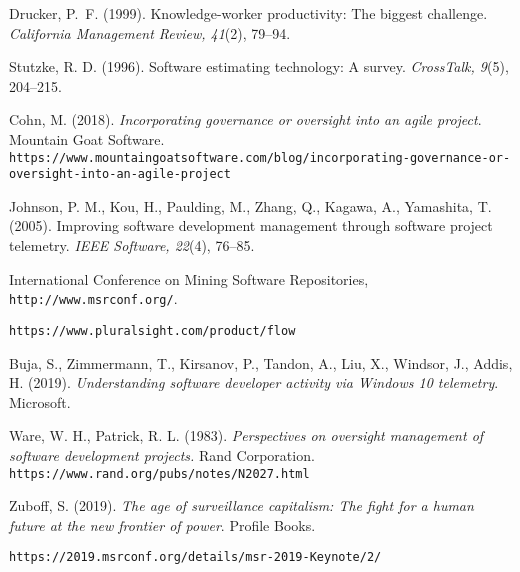 \documentclass[12pt]{article}
\begin{document}
	\begin{thebibliography}{9}
		Drucker, P.\ F. (1999). Knowledge-worker productivity: The biggest challenge. \textit{California Management Review, 41}(2), 79--94.

		Stutzke, R. D. (1996). Software estimating technology: A survey. \textit{CrossTalk, 9}(5), 204--215.
		
		Cohn, M. (2018). \textit{Incorporating governance or oversight into an agile project}. Mountain Goat Software.\\
\texttt{https://www.mountaingoatsoftware.com/blog/incorporating-govern\-ance-or-oversight-into-an-agile-project}
		
		Johnson, P. M., Kou, H., Paulding, M., Zhang, Q., Kagawa, A., Yamashita, T. (2005). Improving software development management through software project telemetry. \textit{IEEE Software, 22}(4), 76--85.
		
		International Conference on Mining Software Repositories,\\ \texttt{http://www.msrconf.org/}.
		
		\texttt{https://www.pluralsight.com/product/flow}
		
		Buja, S., Zimmermann, T., Kirsanov, P., Tandon, A., Liu, X., Windsor, J., Addis, H. (2019). \textit{Understanding software developer activity via Windows 10 telemetry}. Microsoft.
		
		Ware, W. H., Patrick, R. L. (1983). \textit{Perspectives on oversight management of software development projects.} Rand Corporation.\\\texttt{https://www.rand.org/pubs/notes/N2027.html}
		
		Zuboff, S. (2019). \textit{The age of surveillance capitalism: The fight for a human future at the new frontier of power}. Profile Books.
		
		\texttt{https://2019.msrconf.org/details/msr-2019-Keynote/2/}
	\end{thebibliography}
	
\end{document}
